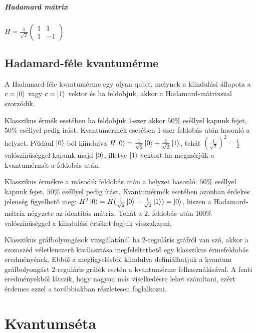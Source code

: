 \paragraph{Hadamard mátrix}

\begin{center}
  $H = \frac{1}{\sqrt{2}}\begin{pmatrix}
      1 & 1  \\
      1 & -1
    \end{pmatrix}$
\end{center}

\section{Hadamard-féle kvantumérme}

A Hadamard-féle kvantumérme egy olyan qubit, melynek a kiindulási állapota a $c
  = \ket{0}$ vagy $c = \ket{1}$ vektor és ha feldobjuk, akkor a
Hadamard-mátrixszal szorzódik.

Klasszikus érmék esetében ha feldobjuk 1-szer akkor $50\%$ eséllyel kapunk
fejet, $50\%$ eséllyel pedig írást. Kvantumérmék esetében 1-szer feldobás után
hasonló a helyzet. Például $\ket{0}$-ból kiindulva $H\ket{0} =
  \frac{1}{\sqrt{2}}\ket{0} + \frac{1}{\sqrt{2}}\ket{1}$, tehát
$(\frac{1}{\sqrt{2}})^2 = \frac{1}{2}$ valószínűséggel kapunk majd $\ket{0}$,
illetve $\ket{1}$ vektort ha megmérjük a kvantumérmét a feldobás után.

Klasszikus érmékre a második feldobás után a helyzet hasonló: $50\%$ eséllyel
kapunk fejet, $50\%$ eséllyel pedig írást. Kvantumérmék esetében azonban
érdekes jelenség figyelhető meg: $H^2\ket{0} = H(\frac{1}{\sqrt{2}}\ket{0} +
  \frac{1}{\sqrt{2}}\ket{1}) = \ket{0}$, hiszen a Hadamard-mátrix négyzete az
identitás mátrix. Tehát a 2. feldobás után $100\%$ valószínűséggel a kiindulási
értéket fogjuk visszakapni.

Klasszikus gráfbolyongások vizsgálatánál ha 2-reguláris gráfról van szó, akkor
a szomszéd véletlenszerű kiválasztása megfeleltethető egy klasszikus
érmefeldobás eredményének. Ebből a megfigyelésből kiindulva definiálhatjuk a
kvantum gráfbolyongást 2-reguláris gráfok esetén a kvantumérme
felhasználásával. A fenti eredményekből látszik, hogy nagyon más viselkedésre
lehet számítani, ezért érdemes ezzel a továbbiakban részletesen foglalkozni.

\chapter{Kvantumséta}

